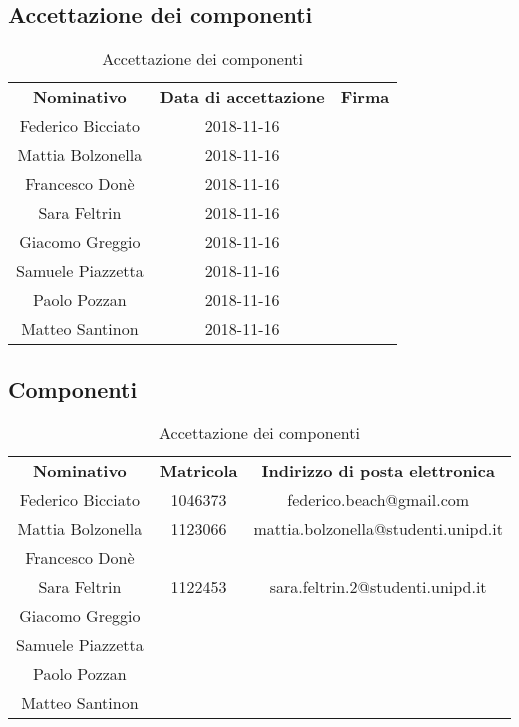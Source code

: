 \subsection{Accettazione dei componenti}
\begin{table}[H]
	\centering\renewcommand{\arraystretch}{1.5}
	\begin{tabular}{c|c|c}
		\hline
		
		\rowcolorhead 
		{ \textbf{Nominativo}} &
		{ \textbf{Data di accettazione}} &
		{ \textbf{Firma}}  \\
		
		\rowcolorlight
		Federico Bicciato & 2018-11-16 &   \\ \hline
		\rowcolordark
		Mattia Bolzonella & 2018-11-16 &   \\ \hline
		\rowcolorlight
		Francesco Donè & 2018-11-16 &   \\ \hline
		\rowcolordark
		Sara Feltrin & 2018-11-16 &   \\ \hline
		\rowcolorlight
		Giacomo Greggio & 2018-11-16 &   \\ \hline
		\rowcolordark
		Samuele Piazzetta & 2018-11-16 &   \\ \hline
		\rowcolorlight
		Paolo Pozzan & 2018-11-16 &   \\ \hline
		\rowcolordark
		Matteo Santinon & 2018-11-16 &   \\ \hline
	\end{tabular}
	\caption{Accettazione dei componenti}
\end{table}

\subsection{Componenti}
\begin{table}[H]
	\centering\renewcommand{\arraystretch}{1.5}
	\begin{tabular}{c|c|c}
		\hline
		
		\rowcolorhead 
		{ \textbf{Nominativo}} &
		{ \textbf{Matricola}} &
		{ \textbf{Indirizzo di posta elettronica}}  \\
		
		\rowcolorlight
		Federico Bicciato & 1046373 & federico.beach@gmail.com  \\ \hline
		\rowcolordark
		Mattia Bolzonella & 1123066 & mattia.bolzonella@studenti.unipd.it  \\ \hline
		\rowcolorlight
		Francesco Donè &  &   \\ \hline
		\rowcolordark
		Sara Feltrin & 1122453 &  sara.feltrin.2@studenti.unipd.it \\ \hline
		\rowcolorlight
		Giacomo Greggio &  &   \\ \hline
		\rowcolordark
		Samuele Piazzetta &  &   \\ \hline
		\rowcolorlight
		Paolo Pozzan &  &   \\ \hline
		\rowcolordark
		Matteo Santinon &  &   \\ \hline
	\end{tabular}
	\caption{Accettazione dei componenti}
\end{table}

